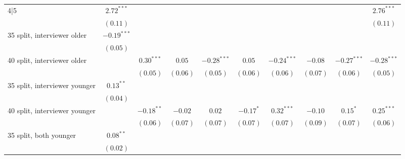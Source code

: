 \begin{table}
\begin{center}
\begin{threeparttable}
\begin{tabular}{l c c c c c c c c c}
4|5                             & $2.72^{***}$  &               &               &               &               &               &               &               & $2.76^{***}$  \\
                                & $(0.11)$      &               &               &               &               &               &               &               & $(0.11)$      \\
35 split, interviewer older     & $-0.19^{***}$ &               &               &               &               &               &               &               &               \\
                                & $(0.05)$      &               &               &               &               &               &               &               &               \\
40 split, interviewer older     &               & $0.30^{***}$  & $0.05$        & $-0.28^{***}$ & $0.05$        & $-0.24^{***}$ & $-0.08$       & $-0.27^{***}$ & $-0.28^{***}$ \\
                                &               & $(0.05)$      & $(0.06)$      & $(0.05)$      & $(0.06)$      & $(0.06)$      & $(0.07)$      & $(0.06)$      & $(0.05)$      \\
35 split, interviewer younger   & $0.13^{**}$   &               &               &               &               &               &               &               &               \\
                                & $(0.04)$      &               &               &               &               &               &               &               &               \\
40 split, interviewer younger   &               & $-0.18^{**}$  & $-0.02$       & $0.02$        & $-0.17^{*}$   & $0.32^{***}$  & $-0.10$       & $0.15^{*}$    & $0.25^{***}$  \\
                                &               & $(0.06)$      & $(0.07)$      & $(0.07)$      & $(0.07)$      & $(0.07)$      & $(0.09)$      & $(0.07)$      & $(0.06)$      \\
35 split, both younger          & $0.08^{**}$   &               &               &               &               &               &               &               &               \\
                                & $(0.02)$      &               &               &               &               &               &               &               &               \\

\end{tabular}
\end{threeparttable}
\end{center}
\end{table}
